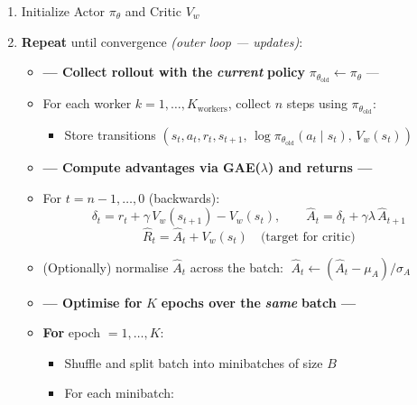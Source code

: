 \documentclass[11pt]{article}
\providecommand{\tightlist}{%
      \setlength{\itemsep}{0pt}\setlength{\parskip}{0pt}}
\begin{document}
\begin{enumerate}
\def\labelenumi{\arabic{enumi}.}
\item
  Initialize Actor \(\pi_\theta\) and Critic \(V_w\)
\item
  \textbf{Repeat} until convergence \emph{(outer loop --- updates)}:

  \begin{itemize}
  \item
    \textbf{--- Collect rollout with the} \textbf{\emph{current}}
    \textbf{policy} \(\pi_{\theta_\text{old}} \leftarrow \pi_\theta\)
    ---
  \item
    For each worker \(k = 1, \ldots, K_\text{workers}\), collect \(n\)
    steps using \(\pi_{\theta_\text{old}}\):

    \begin{itemize}
    \tightlist
    \item
      Store transitions
      \((s_t, a_t, r_t, s_{t+1},\, \log\pi_{\theta_\text{old}}(a_t \mid s_t),\, V_w(s_t))\)
    \end{itemize}
  \item
    \textbf{--- Compute advantages via GAE(\(\lambda\)) and returns ---}
  \item
    For \(t = n{-}1, \ldots, 0\) (backwards):
    \[\delta_t = r_t + \gamma\, V_w(s_{t+1}) - V_w(s_t), \qquad \hat{A}_t = \delta_t + \gamma\lambda\,\hat{A}_{t+1}\]
    \[\hat{R}_t = \hat{A}_t + V_w(s_t) \quad \text{(target for critic)}\]
  \item
    (Optionally) normalise \(\hat{A}_t\) across the batch:
    \(\;\hat{A}_t \leftarrow (\hat{A}_t - \mu_A)/\sigma_A\)
  \item
    \textbf{--- Optimise for} \(K\) \textbf{epochs over the}
    \textbf{\emph{same}} \textbf{batch ---}
  \item
    \textbf{For} epoch \(= 1, \ldots, K\):

    \begin{itemize}
    \tightlist
    \item
      Shuffle and split batch into minibatches of size \(B\)
    \item
      For each minibatch:


\end{itemize}
\end{itemize}
\end{enumerate}
\end{document}

